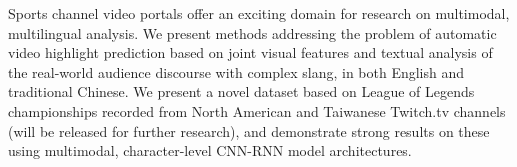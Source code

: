 Sports channel video portals offer an exciting domain for research on multimodal, multilingual analysis. We present methods addressing the problem of automatic video highlight prediction based on joint visual features and textual analysis of the real-world audience discourse with complex slang, in both English and traditional Chinese. We present a novel dataset based on League of Legends championships recorded from North American and Taiwanese Twitch.tv channels (will be released for further research), and demonstrate strong results on these using multimodal, character-level CNN-RNN model architectures.
